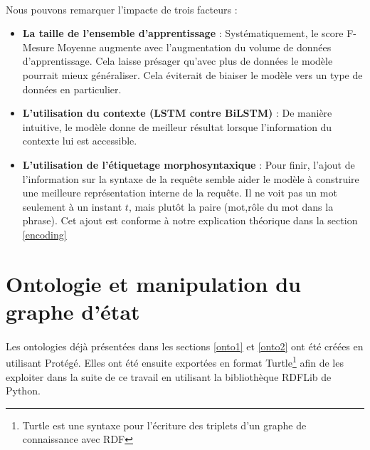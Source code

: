 	\paragraph{}
	Nous pouvons remarquer l'impacte de trois facteurs :
	\begin{itemize}
		\item \textbf{La taille de l'ensemble d'apprentissage} : 
		Systématiquement, le score F-Mesure Moyenne augmente avec l'augmentation du volume de données d'apprentissage. Cela laisse présager qu'avec plus de données le modèle pourrait mieux généraliser. Cela éviterait de biaiser le modèle vers un type de données en particulier.
		
		\item \textbf{L'utilisation du contexte (LSTM contre BiLSTM)} : De manière intuitive, le modèle donne de meilleur résultat lorsque l'information du contexte lui est accessible. 
		
		\item \textbf{L'utilisation de l'étiquetage morphosyntaxique} : Pour finir, l'ajout de l'information sur la syntaxe de la requête semble aider le modèle à construire une meilleure représentation interne de la requête. Il ne voit pas un mot seulement à un instant $t$, mais plutôt la paire (mot,rôle du mot dans la phrase). Cet ajout est conforme à notre explication théorique dans la section \ref{encoding}
	\end{itemize}
\section{Ontologie et manipulation du graphe d'état}
\paragraph{}Les ontologies déjà présentées dans les sections \ref{onto1} et \ref{onto2} ont été créées en utilisant Protégé. Elles ont été ensuite exportées en format Turtle\footnote{Turtle est une syntaxe pour l'écriture des triplets d'un graphe de connaissance avec RDF} afin de les exploiter dans la suite de ce travail en utilisant la bibliothèque RDFLib de Python.
